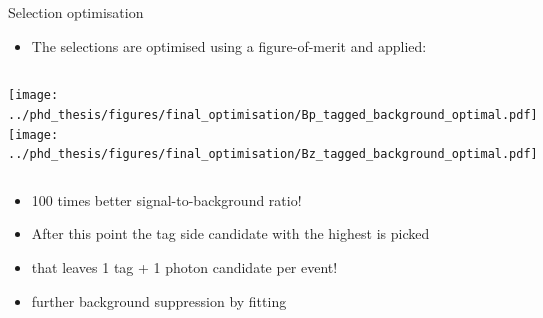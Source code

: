 \documentclass[xcolor=dvipsnames]{beamer}
\begin{document}


\begin{frame}{Selection optimisation}
\centering\scriptsize

\begin{itemize}
   \item The selections are optimised using a figure-of-merit and applied:
\end{itemize}

\vspace{5pt}

\begin{columns}
   \centering
   \texttt{[image: ../phd\_thesis/figures/final\_optimisation/Bp\_tagged\_background\_optimal.pdf]}
   \centering
   \texttt{[image: ../phd\_thesis/figures/final\_optimisation/Bz\_tagged\_background\_optimal.pdf]}
\end{columns}

\begin{itemize}
   \item[\ra] 100 times better signal-to-background ratio!
   \item After this point the tag side candidate with the highest \feiProb is picked
   \item[\ra] that leaves 1 tag + 1 photon candidate per event!
   \item[\ra] further background suppression by fitting
\end{itemize}

\end{frame}
\end{document}
